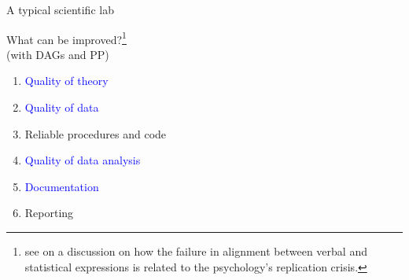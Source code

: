 %
%
\begin{lhframe}[rhgraphic={\texttt{[image: car\_salesman.jpg]}}]
	{A typical scientific lab}
	
	What can be improved?\footnote{see \citet{Yarkoni_2020} on a discussion on how the failure in alignment between verbal and statistical expressions is related to the psychology's replication crisis.}\\
	{\small (with DAGs and PP)}
	\begin{enumerate}
		\item \textcolor{blue}{Quality of theory}
		\item \textcolor{blue}{Quality of data}
		\item \alert{Reliable procedures and code}
		\item \textcolor{blue}{Quality of data analysis}
		\item \textcolor{blue}{Documentation}
		\item Reporting
	\end{enumerate}
\end{lhframe}
%
%
